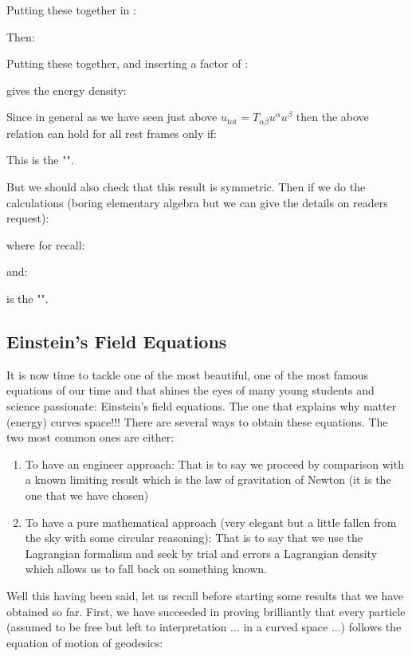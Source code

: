 	Putting these together in :
	
	Then:
	
	Putting these together, and inserting a factor of :
		
	gives the energy density:
	
	Since in general as we have seen just above $u_\text{tot}=T_{\alpha\beta}u^\alpha u^\beta$ then the above relation can hold for all rest frames only if:
	
	This is the "\label{electromagnetic stress energy tensor}".
	
	But we should also check that this result is symmetric. Then if we do the calculations (boring elementary algebra but we can give the details on readers request):
	
	where for recall:
	
	and:
	
	is the "\label{Maxwell stress tensor}".
	
	\pagebreak
	\subsection{Einstein's Field Equations}\label{einstein field equations}
	It is now time to tackle one of the most beautiful, one of the most famous equations of our time and that shines the eyes of many young students and science passionate: Einstein's field equations. The one that explains why matter (energy) curves space!!! There are several ways to obtain these equations. The two most common ones are either:
	\begin{enumerate}
		\item To have an engineer approach: That is to say we proceed by comparison with a known limiting result which is the law of gravitation of Newton (it is the one that we have chosen)

		\item To have a pure mathematical approach (very elegant but a little fallen from the sky with some circular reasoning): That is to say that we use the Lagrangian formalism and seek by trial and errors a Lagrangian density which allows us to fall back on something known.
	\end{enumerate}
	Well this having been said, let us recall before starting some results that we have obtained so far. First, we have succeeded in proving brilliantly that every particle (assumed to be free but left to interpretation ... in a curved space ...) follows the equation of motion of geodesics:
	
